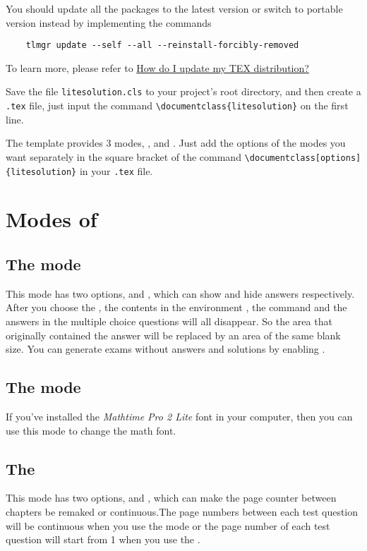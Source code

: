 You should update all the packages to the latest version or switch to portable version instead by implementing the commands 
\begin{verbatim}
    tlmgr update --self --all --reinstall-forcibly-removed
\end{verbatim}

To learn more, please refer to \href{https://tex.stackexchange.com/questions/55437/how-do-i-update-my-tex-distribution}{How do I update my TEX distribution?}

Save the file \verb|litesolution.cls| to your project's root directory, and then create a \verb|.tex| file, just input the command \verb|\documentclass{litesolution}| on the first line.

The template provides 3 modes, ,  and . Just add the options of the modes you want separately in the square bracket of the command \verb|\documentclass[options]{litesolution}| in your \verb|.tex| file.

\section{Modes of }
\subsection{The  mode}
This mode has two options,  and , which can show and hide answers respectively. After you choose the , the contents in the environment , the command  and the answers in the multiple choice questions will all disappear. So the area that originally contained the answer will be replaced by an area of the same blank size. You can generate exams without answers and solutions by enabling .

\subsection{The  mode}
If you've installed the \emph{Mathtime Pro 2 Lite} font in your computer, then you can use this mode to change the math font.

\subsection{The }
This mode has two options,  and , which can make the page counter between chapters be remaked or continuous.The page numbers between each test question will be continuous when you use the  mode or the page number of each test question will start from 1 when you use the .

